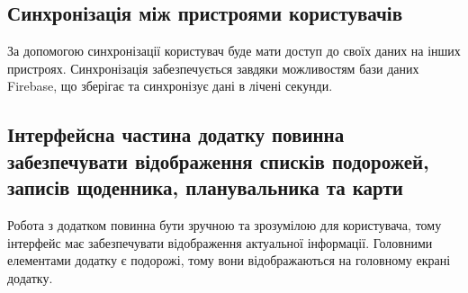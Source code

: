 \documentclass[../main.tex]{subfiles}
\begin{document}
\subsection{Синхронізація між пристроями користувачів}
За допомогою синхронізації користувач буде мати доступ до своїх даних на інших пристроях. Синхронізація забезпечується завдяки можливостям бази даних Firebase, що зберігає та синхронізує дані в лічені секунди.

\subsection{Інтерфейсна частина додатку повинна забезпечувати відображення списків подорожей, записів щоденника, планувальника та карти}
Робота з додатком повинна бути зручною та зрозумілою для користувача, тому інтерфейс має забезпечувати відображення актуальної інформації. Головними елементами додатку є подорожі, тому вони відображаються на головному екрані додатку.
\end{document}
